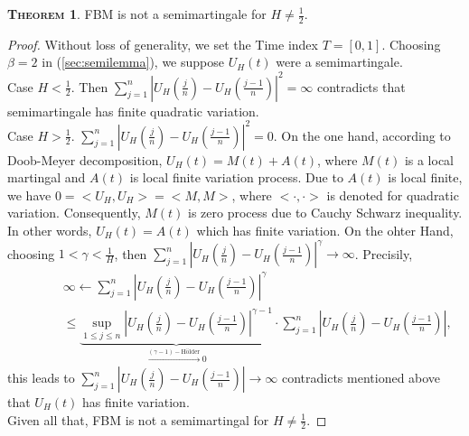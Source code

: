 \documentclass[a4paper, twoside, 11pt]{article}
\theoremstyle{definition}
\newtheorem{theorem}[definition]{\scshape Theorem}
\begin{document}
\begin{theorem}
  FBM is not a semimartingale for $H\neq \frac{1}{2}$.
\end{theorem}
\begin{proof}
  Without loss of generality, we set the Time index $T=[0, 1]$. Choosing $\beta=2$ in (\ref{sec:semilemma}), we suppose $U_H(t)$ were a semimartingale.\\
  Case $H < \frac{1}{2}$. Then $\sum_{j=1}^n |U_H(\frac{j}{n}) - U_H(\frac{j-1}{n})|^2=\infty$ contradicts that semimartingale has finite quadratic variation.\\
  Case $H > \frac{1}{2}$. $\sum_{j=1}^n |U_H(\frac{j}{n}) - U_H(\frac{j-1}{n})|^2=0$. On the one hand, according to Doob-Meyer decomposition, $U_H(t) = M(t) + A(t)$, where $M(t)$ is a local martingal and $A(t)$ is local finite variation process. Due to $A(t)$ is local finite, we have $0=<U_H, U_H> = <M, M> $, where $<\cdot,\cdot>$ is denoted for quadratic variation. Consequently, $M(t)$ is zero process due to Cauchy Schwarz inequality. In other words, $U_H(t)=A(t)$ which has finite variation. On the ohter Hand, choosing $1<\gamma<\frac{1}{H}$, then $\sum_{j=1}^n |U_H(\frac{j}{n}) - U_H(\frac{j-1}{n})|^\gamma \rightarrow \infty$. Precisily, 
  \begin{eqnarray*}
	 &&\infty \leftarrow \sum_{j=1}^n |U_H(\frac{j}{n}) - U_H(\frac{j-1}{n})|^\gamma\\
	 &\hspace{2em}&\le \underbrace{\sup\limits_{1\le j\le n}|U_H(\frac{j}{n}) - U_H(\frac{j-1}{n})|^{\gamma-1}}_{\overset{(\gamma-1)-\text{H\"older}}{\rightarrow}0} \cdot \sum_{j=1}^n|U_H(\frac{j}{n}) - U_H(\frac{j-1}{n})|,
  \end{eqnarray*}
  this leads to $\sum_{j=1}^n|U_H(\frac{j}{n}) - U_H(\frac{j-1}{n})|\rightarrow \infty$ contradicts mentioned above that $U_H(t)$ has finite variation.\\
  Given all that, FBM is not a semimartingal for $H\neq \frac{1}{2}$.
\end{proof}
\end{document}
